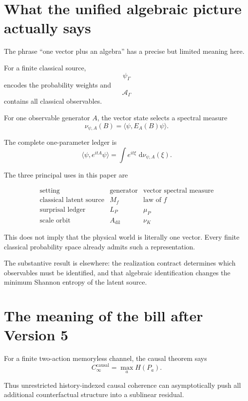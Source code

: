 \documentclass[11pt,a4paper]{article}
\newcommand{\CinfCausal}{C_{\infty}^{\mathrm{causal}}}
\newcommand{\cA}{\mathcal A}
\newcommand{\1}{\mathbf 1}
\newcommand{\dd}{\,\mathrm d}
\newcommand{\ip}[2]{\langle #1,#2\rangle}
\begin{document}
\section{What the unified algebraic picture actually says}

The phrase ``one vector plus an algebra'' has a precise but limited
meaning here.

For a finite classical source,
\[
\psi_\Gamma
\]
encodes the probability weights and
\[
\cA_\Gamma
\]
contains all classical observables.

For one observable generator \(A\), the vector state selects a spectral
measure
\[
\nu_{\psi,A}(B)
=
\ip{\psi}{E_A(B)\psi}.
\]

The complete one-parameter ledger is
\[
\ip{\psi}{e^{itA}\psi}
=
\int e^{it\xi}\,\dd\nu_{\psi,A}(\xi).
\]

The three principal uses in this paper are

\[
\boxed{
\begin{array}{c|c|c}
\text{setting}
&
\text{generator}
&
\text{vector spectral measure}
\\
\hline
\text{classical latent source}
&
M_f
&
\text{law of }f
\\
\text{surprisal ledger}
&
L_P
&
\mu_P
\\
\text{scale orbit}
&
A_{\mathrm{dil}}
&
\nu_K
\end{array}
}
\tag{40.1}
\]

This does not imply that the physical world is literally one vector.
Every finite classical probability space already admits such a
representation.

The substantive result is elsewhere:
the realization contract determines which observables must be
identified, and that algebraic identification changes the minimum
Shannon entropy of the latent source.


\section{The meaning of the bill after Version 5}

For a finite two-action memoryless channel, the causal theorem says
\[
\CinfCausal
=
\max_aH(P_a).
\tag{41.1}
\]

Thus unrestricted history-indexed causal coherence can asymptotically
push all additional counterfactual structure into a sublinear residual.
\end{document}

